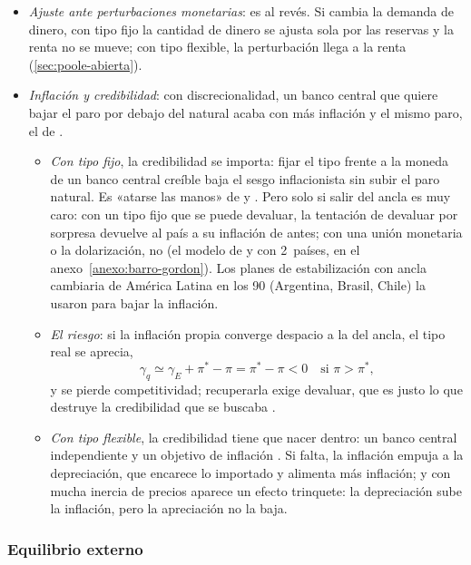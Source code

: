 \documentclass[11pt]{article}
\begin{document}
\begin{itemize}
\begin{itemize}
  \end{itemize}
\item \emph{Ajuste ante perturbaciones monetarias}: es al revés. Si cambia la demanda de dinero, con tipo fijo la cantidad de dinero se ajusta sola por las reservas y la renta no se mueve; con tipo flexible, la perturbación llega a la renta (\ref{sec:poole-abierta}).
\item \emph{Inflación y credibilidad}: con discrecionalidad, un banco central que quiere bajar el paro por debajo del natural acaba con más inflación y el mismo paro, el  de \textcite{BarroGordon1983Positive} .
  \begin{itemize}
  \item \emph{Con tipo fijo}, la credibilidad se importa: fijar el tipo frente a la moneda de un banco central creíble baja el sesgo inflacionista sin subir el paro natural. Es «atarse las manos» de  y \nocite{GiavazziPagano1988Advantage} . Pero solo si salir del ancla es muy caro: con un tipo fijo que se puede devaluar, la tentación de devaluar por sorpresa devuelve al país a su inflación de antes; con una unión monetaria o la dolarización, no (el modelo de  y  con 2~países, en el anexo~\ref{anexo:barro-gordon}). Los planes de estabilización con ancla cambiaria de América Latina en los 90 (Argentina, Brasil, Chile) la usaron para bajar la inflación.
  \item \emph{El riesgo}: si la inflación propia converge despacio a la del ancla, el tipo real se aprecia,
    \begin{equation}\label{eq:apreciacion-real}
    \gamma_q\simeq\gamma_E+\pi^*-\pi=\pi^*-\pi<0\quad\text{si }\pi>\pi^*,
    \end{equation}
    y se pierde competitividad; recuperarla exige devaluar, que es justo lo que destruye la credibilidad que se buscaba .
  \item \emph{Con tipo flexible}, la credibilidad tiene que nacer dentro: un banco central independiente y un objetivo de inflación . Si falta, la inflación empuja a la depreciación, que encarece lo importado y alimenta más inflación; y con mucha inercia de precios aparece un efecto trinquete: la depreciación sube la inflación, pero la apreciación no la baja.
  \end{itemize}
\end{itemize}

\subsubsection{Equilibrio externo}\label{sec:equilibrio-externo}
\end{document}
